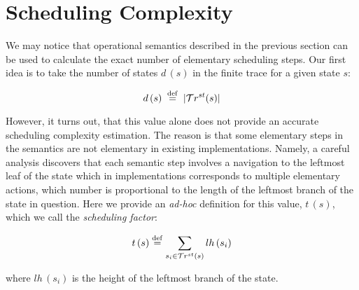 \section{Scheduling Complexity}
\label{sec:scheduling}


We may notice that operational semantics described in the previous section can be used to calculate the exact number of elementary scheduling steps.
Our first idea is to take the number of states $d\,(s)$ in the finite trace for a given state $s$:

\[ d\,(s) \; \overset{\mathrm{def}}{=} \; | \mathcal{T}r^{st}(s) |  \]

However, it turns out, that this value alone does not provide an accurate scheduling complexity estimation. The reason is that some
elementary steps in the semantics are not elementary in existing implementations. Namely, a careful analysis discovers that
each semantic step involves a navigation to the leftmost leaf of the state which in implementations corresponds to multiple elementary actions,
which number is proportional to the length of the leftmost branch of the state in question. Here we provide an \emph{ad-hoc} definition for this value, $t\,(s)$,
which we call the \emph{scheduling factor}:

\[
t\,(s) \overset{\mathrm{def}}{=} \sum\limits_{s_i \in \mathcal{T}r^{st}(s)} lh\,(s_i) 
\]

where $lh\,(s_i)$ is the height of the leftmost branch of the state. 

\begin{comment}
\[
\begin{array}{rcl}
 lh\,(\taskst{g}{e})  &\eqdef& 1 \\
 lh\,(s_1 \oplus s_2) &\eqdef& lh\,(s_1) + 1 \\
 lh\,(s \otimes g)    &\eqdef& lh\,(s) + 1 \\
\end{array}
\]
\end{comment}


